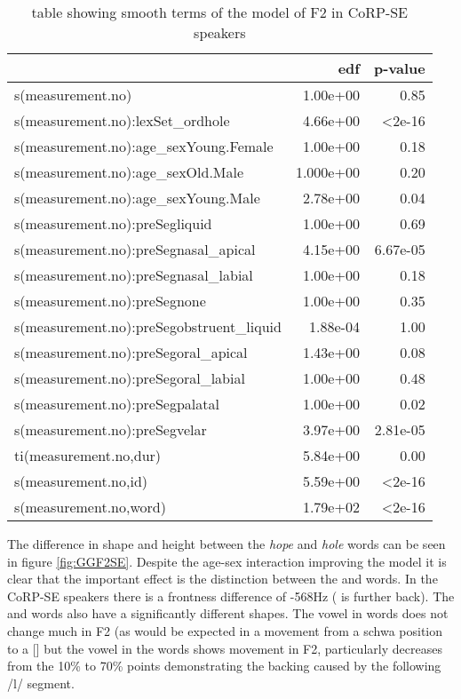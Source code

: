 \documentclass[../../../00.FullDoc/tex/Thesis]{subfiles}
\begin{document}
\begin{table}[htbp]
	\centering
	\begin{tabular}{lrr}
		\hline
		& edf & p-value \\
		\hline
		s(measurement.no) & 1.00e+00 & 0.85 \\
		s(measurement.no):lexSet\_ordhole & 4.66e+00 & <2e-16 \\
		s(measurement.no):age\_sexYoung.Female & 1.00e+00 & 0.18 \\
		s(measurement.no):age\_sexOld.Male & 1.000e+00 & 0.20 \\
		s(measurement.no):age\_sexYoung.Male & 2.78e+00 & 0.04 \\
		s(measurement.no):preSegliquid & 1.00e+00 & 0.69 \\
		s(measurement.no):preSegnasal\_apical & 4.15e+00 & 6.67e-05 \\
		s(measurement.no):preSegnasal\_labial & 1.00e+00 & 0.18 \\
		s(measurement.no):preSegnone & 1.00e+00 & 0.35 \\
		s(measurement.no):preSegobstruent\_liquid & 1.88e-04 & 1.00 \\
		s(measurement.no):preSegoral\_apical & 1.43e+00 & 0.08 \\
		s(measurement.no):preSegoral\_labial & 1.00e+00 & 0.48 \\
		s(measurement.no):preSegpalatal & 1.00e+00 & 0.02 \\
		s(measurement.no):preSegvelar & 3.97e+00 & 2.81e-05 \\
		ti(measurement.no,dur) & 5.84e+00 & 0.00 \\
		s(measurement.no,id) & 5.59e+00 & <2e-16 \\
		s(measurement.no,word) & 1.79e+02 & <2e-16 \\
		\hline
	\end{tabular}
	\caption{table showing smooth terms of the model of F2 in CoRP-SE speakers}
	\label{tbl:GGF2SE-smooth}
\end{table}

The difference in shape and height between the \textit{hope} and \textit{hole} words can be seen in figure \ref{fig:GGF2SE}. Despite the age-sex interaction improving the model it is clear that the important effect is the distinction between the \hope{} and \hole{} words. In the CoRP-SE speakers there is a frontness difference of -568Hz (\hole{} is further back). The \hope{} and \hole{} words also have a significantly different shapes. The vowel in \hope{} words does not change much in F2 (as would be expected in a movement from a schwa position to a [] but the vowel in the \hole{} words shows movement in F2, particularly decreases from the 10\% to 70\% points demonstrating the backing caused by the following /l/ segment. 
\end{document}
